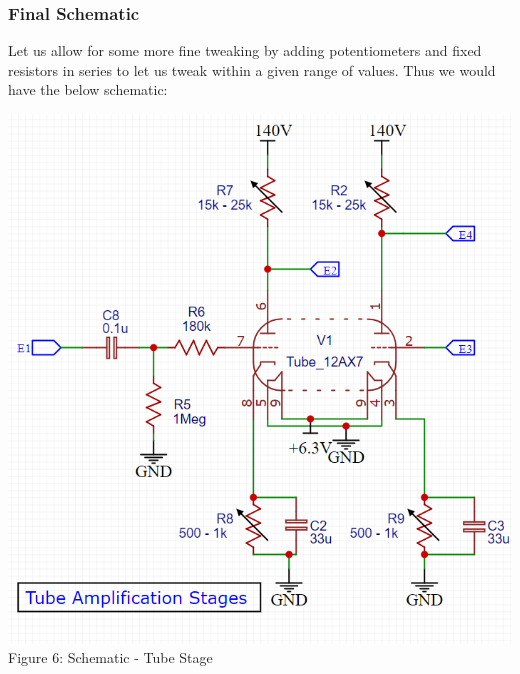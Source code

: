 \documentclass[11pt]{article}
\newcommand{\tab}{\hspace*{6mm}}
\begin{document}
\subsubsection{Final Schematic}
\tab Let us allow for some more fine tweaking by adding potentiometers and fixed resistors in series to let us tweak within a given range of values. Thus we would have the below schematic:
\begin{center}\includegraphics[width = \textwidth]{sch_tube.png}\\\small{Figure 6: Schematic - Tube Stage}\end{center}
\newpage
\end{document}
